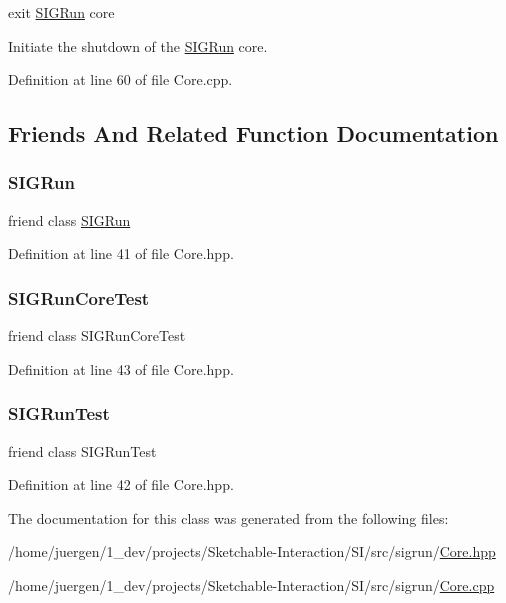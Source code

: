 exit \mbox{\hyperlink{class_s_i_g_run}{S\+I\+G\+Run}} core 

Initiate the shutdown of the \mbox{\hyperlink{class_s_i_g_run}{S\+I\+G\+Run}} core. 

Definition at line 60 of file Core.\+cpp.



\subsection{Friends And Related Function Documentation}
\mbox{\label{class_core_a5f9132838c20db918d2592c4c0f0dcbb}} 
\subsubsection{\texorpdfstring{SIGRun}{SIGRun}}
{\footnotesize\ttfamily friend class \mbox{\hyperlink{class_s_i_g_run}{S\+I\+G\+Run}}\hspace{0.3cm}{\ttfamily [friend]}}



Definition at line 41 of file Core.\+hpp.

\mbox{\label{class_core_a0428dbcb31e2aacead72907324826035}} 
\subsubsection{\texorpdfstring{SIGRunCoreTest}{SIGRunCoreTest}}
{\footnotesize\ttfamily friend class S\+I\+G\+Run\+Core\+Test\hspace{0.3cm}{\ttfamily [friend]}}



Definition at line 43 of file Core.\+hpp.

\mbox{\label{class_core_a703c4760c08c6e9065d8bd71b05c3d63}} 
\subsubsection{\texorpdfstring{SIGRunTest}{SIGRunTest}}
{\footnotesize\ttfamily friend class S\+I\+G\+Run\+Test\hspace{0.3cm}{\ttfamily [friend]}}



Definition at line 42 of file Core.\+hpp.



The documentation for this class was generated from the following files\+:\begin{DoxyCompactItemize}
\item 
/home/juergen/1\+\_\+dev/projects/\+Sketchable-\/\+Interaction/\+S\+I/src/sigrun/\mbox{\hyperlink{_core_8hpp}{Core.\+hpp}}\item 
/home/juergen/1\+\_\+dev/projects/\+Sketchable-\/\+Interaction/\+S\+I/src/sigrun/\mbox{\hyperlink{_core_8cpp}{Core.\+cpp}}\end{DoxyCompactItemize}
